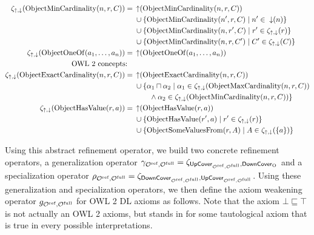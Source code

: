 {\begin{align*}
 \zeta_{\mathop{\uparrow}, \mathop{\downarrow}}(\mathrm{ObjectMinCardinality}(n, r, C)) ={} & \mathop{\uparrow} (\mathrm{ObjectMinCardinality}(n, r, C)) \\& \cup \{\mathrm{ObjectMinCardinality}(n', r, C) \mid n' \in \; \mathop{\downarrow} (n)\} \\& \cup \{\mathrm{ObjectMinCardinality}(n, r', C) \mid r' \in \zeta_{\mathop{\uparrow}, \mathop{\downarrow}}(r)\} \\& \cup \{\mathrm{ObjectMinCardinality}(n, r, C') \mid C' \in \zeta_{\mathop{\uparrow}, \mathop{\downarrow}} (C)\} \\
 \zeta_{\mathop{\uparrow}, \mathop{\downarrow}}(\mathrm{ObjectOneOf}(a_1, \dots, a_n)) ={} & \mathop{\uparrow} (\mathrm{ObjectOneOf}(a_1, \dots, a_n)) \\
 \text{OWL 2 concepts:} \quad & \\
 \zeta_{\mathop{\uparrow}, \mathop{\downarrow}}(\mathrm{ObjectExactCardinality}(n, r, C)) ={} & \mathop{\uparrow} (\mathrm{ObjectExactCardinality}(n, r, C)) \\& \cup \{ \alpha_1 \sqcap \alpha_2 \mid \alpha_1 \in \zeta_{\mathop{\uparrow}, \mathop{\downarrow}} (\mathrm{ObjectMaxCardinality}(n, r, C)) \\ \;& \qquad \land \alpha_2 \in \zeta_{\mathop{\uparrow}, \mathop{\downarrow}} (\mathrm{ObjectMinCardinality}(n, r, C)) \} \\
 \zeta_{\mathop{\uparrow}, \mathop{\downarrow}}(\mathrm{ObjectHasValue}(r, a)) ={} & \mathop{\uparrow} (\mathrm{ObjectHasValue}(r, a)) \\& \cup \{\mathrm{ObjectHasValue}(r', a) \mid r' \in \zeta_{\mathop{\uparrow}, \mathop{\downarrow}} (r)\} \\& \cup \{\mathrm{ObjectSomeValuesFrom}(r, A) \mid A \in \zeta_{\mathop{\uparrow}, \mathop{\downarrow}} (\{a\})\}
\end{align*}
}

Using this abstract refinement operator, we build two concrete refinement operators, a generalization operator $\gamma_{{\mathcal{O}^\textnormal{ref}},{\mathcal{O}^\textnormal{full}}} = \zeta_{{\mathsf{UpCover}}_{{\mathcal{O}^\textnormal{ref}},{\mathcal{O}^\textnormal{full}}}, {\mathsf{DownCover}}_\mathrm{O}}$ and a specialization operator $\rho_{{\mathcal{O}^\textnormal{ref}},{\mathcal{O}^\textnormal{full}}} = \zeta_{{\mathsf{DownCover}}_{{\mathcal{O}^\textnormal{ref}},{\mathcal{O}^\textnormal{full}}}, {\mathsf{UpCover}}_{{\mathcal{O}^\textnormal{ref}},{\mathcal{O}^\textnormal{full}}}}$. Using these generalization and specialization operators, we then define the axiom weakening operator $g_{{\mathcal{O}^\textnormal{ref}},{\mathcal{O}^\textnormal{full}}}$ for OWL 2 DL axioms as follows. Note that the axiom $\bot \sqsubseteq \top$ is not actually an OWL 2 axioms, but stands in for some tautological axiom that is true in every possible interpretations.

